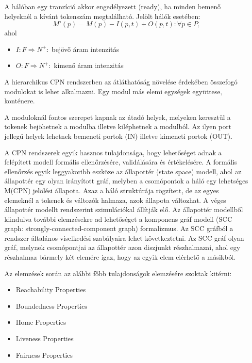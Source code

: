 A hálóban egy tranzíció akkor engedélyezett (ready), ha minden bemenő helyeknél a kívánt tokenszám megtalálható.   Jelölt hálók esetében:
$$M'(p)=M(p)-I(p,t)+O(p,t): \forall p\in P,$$ ahol 
\begin{itemize}
\item $I:F\Rightarrow N^+:$  bejövő áram intenzitás
\item $O:F\Rightarrow N^+:$ kimenő áram intenzitás

\end{itemize}
A hierarchikus CPN rendszerben az átláthatóság növelése érdekében összefogó modulokat is lehet alkalmazni. Egy modul más elemi egységek együttese, konténere. %

A moduloknál fontos szerepet kapnak az átadó helyek, melyeken keresztül a tokenek bejöhetnek a modulba illetve kiléphetnek a modulból. Az ilyen port jellegű helyek lehetnek bemeneti portok (IN) illetve kimeneti portok (OUT).  

A CPN rendszerek egyik hasznos tulajdonsága, hogy lehetőséget adnak a felépített modell formális ellenőrzésére, validálására és értékelésére. A formális ellenőrzés egyik leggyakoribb eszköze az állapottér (state space)  modell, ahol az állapottér egy olyan irányított gráf, melyben a csomópontok a háló egy lehetséges  M(CPN) jelölési állapota. Azaz a háló struktúrája rögzített, de az egyes elemeknél a tokenek és változók halmaza, azok állapota változhat. A véges állapottér modellt rendszerint szimulációkal állítják elő. 
\newpage
Az állapottér modellből kiindulva további elemzésekre ad lehetőséget a komponens gráf modell (SCC graph:  strongly-connected-component graph) formalizmus. Az  SCC gráfból a rendszer általános viselkedési szabályaira lehet következtetni. Az SCC gráf olyan gráf, melynek csomópontjai  az állapottér azon diszjunkt részhalmazai, ahol egy részhalmaz bármely két elemére igaz, hogy az egyik elem  elérhető a másikból. 

Az elemzések során az alábbi főbb tulajdonságok elemzésére szoktak kitérni:
\begin{itemize}
\item Reachability Properties
\item Boundedness Properties
\item Home Properties 
\item Liveness Properties
\item Fairness Properties
\end{itemize}
